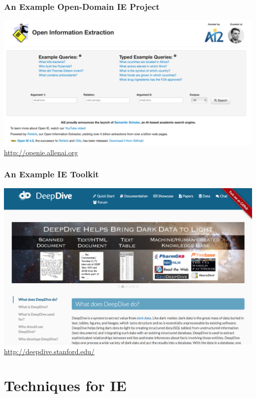\documentclass{beamer}
\begin{document}
\begin{frame}
  \frametitle{An Example Open-Domain IE Project}
  \centering
  \includegraphics[width=\linewidth]{openie}\\
  \footnotesize\url{http://openie.allenai.org}
\end{frame}

\begin{frame}
  \frametitle{An Example IE Toolkit}
  \centering
  \includegraphics[width=\linewidth]{deepdive}\\
  \footnotesize\url{http://deepdive.stanford.edu/}
\end{frame}

\section{Techniques for IE}
\end{document}
